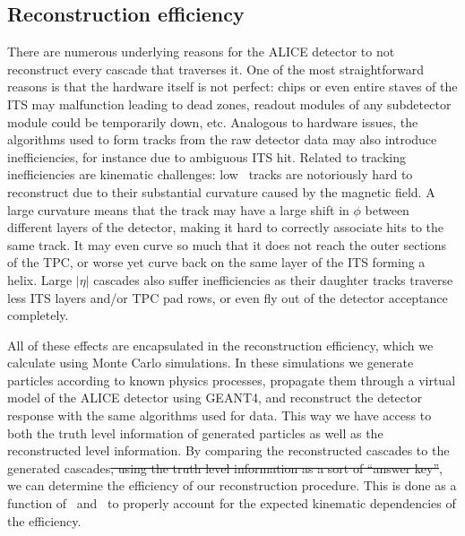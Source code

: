   \subsection{Reconstruction efficiency}
  \label{sec:efficiency}

    There are numerous underlying reasons for the ALICE detector to not reconstruct every cascade that traverses it. One of the most straightforward reasons is that the hardware itself is not perfect: chips or even entire staves of the ITS may malfunction leading to dead zones, readout modules of any subdetector module could be temporarily down, etc. Analogous to hardware issues, the algorithms used to form tracks from the raw detector data may also introduce inefficiencies, for instance due to ambiguous ITS hit. Related to tracking inefficiencies are kinematic challenges: low \pt\ tracks are notoriously hard to reconstruct due to their substantial curvature caused by the magnetic field. A large curvature means that the track may have a large shift in $\phi$ between different layers of the detector, making it hard to correctly associate hits to the same track. It may even curve so much that it does not reach the outer sections of the TPC, or worse yet curve back on the same layer of the ITS forming a helix. Large $|\eta|$ cascades also suffer inefficiencies as their daughter tracks traverse less ITS layers and/or TPC pad rows, or even fly out of the detector acceptance completely.

    All of these effects are encapsulated in the reconstruction efficiency, which we calculate using Monte Carlo simulations. 
    In these simulations we generate particles according to known physics processes, propagate them through a virtual model of the ALICE detector using GEANT4, and reconstruct the detector response with the same algorithms used for data. This way we have access to both the truth level information of generated particles as well as the reconstructed level information. By comparing the reconstructed cascades to the generated cascades\sout{, using the truth level information as a sort of ``answer key''}, we can determine the efficiency of our reconstruction procedure. This is done as a function of \pt\ and \eta\ to properly account for the expected kinematic dependencies of the efficiency.

